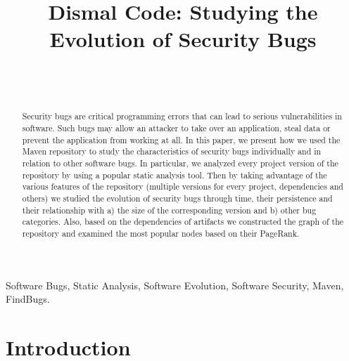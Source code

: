 \documentclass[conference]{IEEEtran}
\begin{document}
\author{
\\
\\
}

\title{Dismal Code: Studying the Evolution of Security Bugs}

\maketitle

\begin{abstract}
Security bugs are critical programming errors that can lead to serious
vulnerabilities in software. Such bugs may allow an attacker to take over
an application, steal data or prevent the application from working at all.
In this paper, we present how we used the Maven repository to study the
characteristics of security bugs individually and in relation to other software
bugs. In particular, we analyzed every project version of the repository by using a
popular static analysis tool. Then by taking advantage of the various features of
the repository (multiple versions for every project, dependencies and others) we studied
the evolution of security bugs through time, their persistence and their relationship with a) the
size of the corresponding version and b) other bug categories. Also, based on the
dependencies of artifacts we constructed the graph of the repository and
examined the most popular nodes based on their PageRank. 
\end{abstract}

\begin{IEEEkeywords}
Software Bugs, Static Analysis, Software Evolution, Software
Security, Maven, FindBugs.
\end{IEEEkeywords}

\IEEEpeerreviewmaketitle

\section{Introduction}
\end{document}

